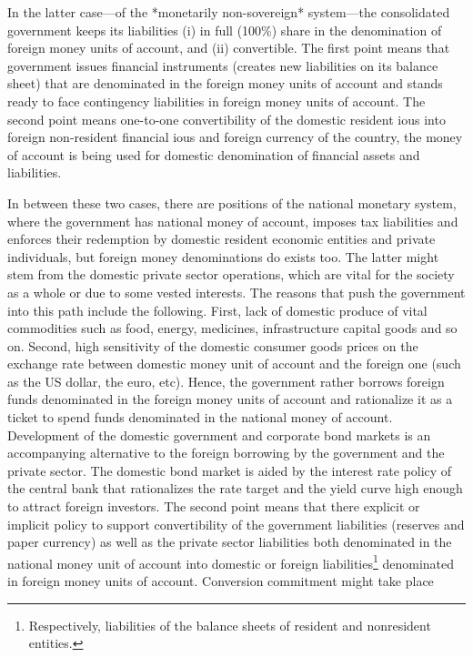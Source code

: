 In the latter case---of the *monetarily non-sovereign* system---the
consolidated government keeps its liabilities (i) in full (100\%) share
in the denomination of foreign money units of account, and (ii)
convertible. The first point means that government issues financial
instruments (creates new liabilities on its balance sheet) that are
denominated in the foreign money units of account and stands ready to
face contingency liabilities in foreign money units of account. The
second point means one-to-one convertibility of the domestic resident
\acp{iou} into foreign non-resident financial \acp{iou} and foreign currency of
the country, the money of account is being used for domestic
denomination of financial assets and liabilities.

In between these two cases, there are positions of the national monetary
system, where the government has national money of account, imposes
tax liabilities and enforces their redemption by domestic resident
economic entities and private individuals, but foreign money
denominations do exists too. The latter might stem from the domestic
private sector operations, which are vital for the society as a whole or
due to some vested interests. The reasons that push the government into
this path include the following. First, lack of domestic produce of
vital commodities such as food, energy, medicines, infrastructure
capital goods and so on. Second, high sensitivity of the domestic
consumer goods prices on the exchange rate between domestic money unit
of account and the foreign one (such as the US dollar, the euro, etc).
Hence, the government rather borrows foreign funds denominated in the
foreign money units of account and rationalize it as a ticket to spend
funds denominated in the national money of account. Development of
the domestic government and corporate bond markets is an accompanying
alternative to the foreign borrowing by the government and the private
sector. The domestic bond market is aided by the interest rate policy of
the central bank that rationalizes the rate target and the yield curve
high enough to attract foreign investors. The second point means that
there explicit or implicit policy to support convertibility of the
government liabilities (reserves and paper currency) as well as the
private sector liabilities both denominated in the national money unit
of account into domestic or foreign liabilities\footnote{Respectively, liabilities of the balance sheets of resident and nonresident entities.} denominated in
foreign money units of account. Conversion commitment might take place
